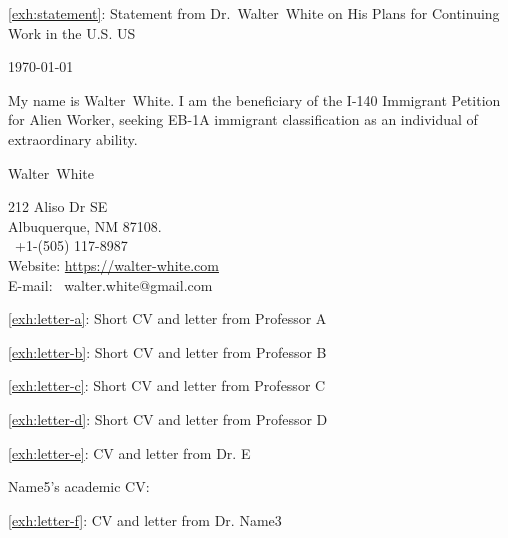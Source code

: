 \documentclass{article}
\newcommand{\fname}{Walter}
\newcommand{\lname}{White}
\newcommand{\fullname}{\fname~\lname}
\newcommand{\dr}{Dr.~\fname~\lname}
\newcommand{\myaddr}{212 Aliso Dr SE \\ Albuquerque, NM 87108. \\ \faMobilePhone \ +1-(505) 117-8987}
\newcounter{exhibit}
\begin{document}
\pagebreak
\begin{center}
\Large{\ref{exh:statement}: Statement from \dr{} on His Plans for Continuing Work in the U.S.
US
}
\end{center}

\today

My name is \fullname{}.
I am the beneficiary of the I-140 Immigrant Petition for Alien Worker,
seeking EB-1A immigrant classification as an individual of extraordinary ability.
%

\lipsum[1-1]

\vspace{2em}

\fullname

\vspace{-1em}

\myaddr \\
Website: \url{https://walter-white.com}   \\
E-mail: \ walter.white@gmail.com
\pagebreak


\pagebreak
\begin{center}
    \Large{\ref{exh:letter-a}: Short CV and letter from Professor A}
\end{center}
% 


\pagebreak
\begin{center}
    \Large{\ref{exh:letter-b}: Short CV and letter from Professor B}
\end{center}
% 

\pagebreak
\begin{center}
    \Large{\ref{exh:letter-c}: Short CV and letter from Professor C}
\end{center}
% 

\pagebreak
\begin{center}
    \Large{\ref{exh:letter-d}: Short CV and letter from Professor D}
\end{center}
% 

\pagebreak
\begin{center}
    \Large{\ref{exh:letter-e}: CV and letter from Dr. E}
\end{center}
\begin{center}
    Name5's academic CV:
\end{center}

\pagebreak
% 

\begin{center}
    \Large{\ref{exh:letter-f}: CV and letter from Dr. Name3}
\end{center}
% 
\end{document}
